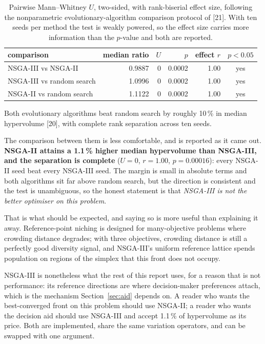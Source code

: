 \documentclass[11pt,a4paper]{article}
\begin{document}
\begin{table}[h]
\centering\small
\caption{Pairwise Mann--Whitney $U$, two-sided, with rank-biserial effect
size, following the nonparametric evolutionary-algorithm comparison protocol
of [21]. With ten seeds per method the test is weakly powered, so the effect
size carries more information than the $p$-value and both are reported.}
\begin{tabular}{lrrrrc}
\toprule
comparison & median ratio & $U$ & $p$ & effect $r$ & $p<0.05$ \\
\midrule
NSGA-III vs NSGA-II & 0.9887 & 0 & 0.0002 & 1.00 & yes \\
NSGA-III vs random search & 1.0996 & 0 & 0.0002 & 1.00 & yes \\
NSGA-II vs random search & 1.1122 & 0 & 0.0002 & 1.00 & yes \\
\bottomrule
\end{tabular}
\end{table}

Both evolutionary algorithms beat random search by roughly 10\,\% in
median hypervolume [20], with complete rank separation across ten seeds.

The comparison between them is less comfortable, and is reported as it came
out. \textbf{NSGA-II attains a 1.1\,\% higher median hypervolume
than NSGA-III, and the separation is complete} ($U=0$, $r=1.00$,
$p=0.00016$): every NSGA-II seed beat every NSGA-III seed. The margin is small
in absolute terms and both algorithms sit far above random search, but the
direction is consistent and the test is unambiguous, so the honest statement is
that \emph{NSGA-III is not the better optimiser on this problem}.

That is what should be expected, and saying so is more useful than explaining
it away. Reference-point niching is designed for many-objective problems where
crowding distance degrades; with three objectives, crowding distance is still a
perfectly good diversity signal, and NSGA-III's uniform reference lattice
spends population on regions of the simplex that this front does not occupy.

NSGA-III is nonetheless what the rest of this report uses, for a reason that is
not performance: its reference directions are where decision-maker preferences
attach, which is the mechanism Section~\ref{sec:aid} depends on. A reader who
wants the best-converged front on this problem should use NSGA-II; a reader who
wants the decision aid should use NSGA-III and accept 1.1\,\% of
hypervolume as its price. Both are implemented, share the same variation
operators, and can be swapped with one argument.
\end{document}
